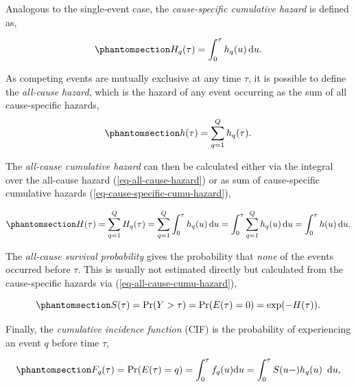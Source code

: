 \documentclass[
  letterpaper,
  krantz2]{style/krantz}
\begin{document}
Analogous to the single-event case, the \emph{cause-specific cumulative
hazard} is defined as,

\begin{equation}\phantomsection\label{eq-cause-specific-cumu-hazard}{
H_{q}(\tau) = \int_{0}^\tau h_q(u) \,\mathrm{d}u.
}\end{equation}

As competing events are mutually exclusive at any time \(\tau\), it is
possible to define the \emph{all-cause
hazard}, which is the hazard of any
event occurring as the sum of all cause-specific hazards,
\begin{equation}\phantomsection\label{eq-all-cause-hazard}{
h(\tau) = \sum_{q = 1}^Q h_q(\tau).
}\end{equation}

The \emph{all-cause cumulative
hazard} can then be
calculated either via the integral over the all-cause hazard
(\ref{eq-all-cause-hazard}) or as sum of cause-specific cumulative
hazards (\ref{eq-cause-specific-cumu-hazard}),

\begin{equation}\phantomsection\label{eq-all-cause-cumu-hazard}{
H(\tau) 
 = \sum_{q=1}^Q H_{q}(\tau) = \sum_{q=1}^{Q}\int_{0}^\tau h_{q}(u) \,\mathrm{d}u
 =\int_{0}^\tau \sum_{q=1}^{Q} h_{q}(u) \,\mathrm{d}u= \int_{0}^\tau h(u) \,\mathrm{d}u.
}\end{equation}

The \emph{all-cause survival
probability} gives the probability
that \emph{none} of the events occurred before \(\tau\). This is usually
not estimated directly but calculated from the cause-specific hazards
via (\ref{eq-all-cause-cumu-hazard}),

\begin{equation}\phantomsection\label{eq-all-cause-surv-prob}{
S(\tau) = \Pr(Y > \tau) = \Pr(E(\tau) = 0) = \exp(-H(\tau)).
}\end{equation}

Finally, the \emph{cumulative incidence function}
(CIF) is the probability of
experiencing an event \(q\) before time \(\tau\),

\begin{equation}\phantomsection\label{eq-cif}{
F_q(\tau) = \Pr(E(\tau) = q)  = \int_{0}^\tau f_q(u) \mathrm{d}u = \int_{0}^\tau S(u-)h_q(u)\ \,\mathrm{d}u,
}\end{equation}
\end{document}

